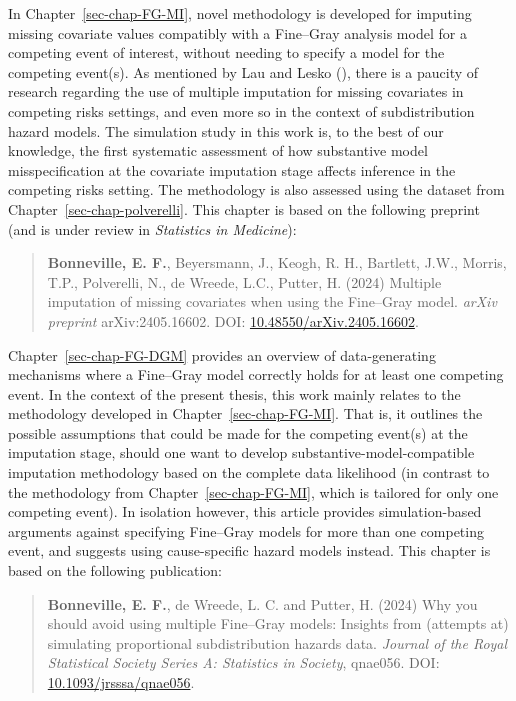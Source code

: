 \documentclass[
  letterpaper,
  paper=240mm:170mm,
  twoside=true,
  open=right,
  fontsize=10pt,
  pagesize=false,
  BCOR=15mm,
  DIV=14,
  headinclude=true,
  footinclude=false,
  headsepline=on]{scrbook}
\begin{document}
In Chapter~\ref{sec-chap-FG-MI}, novel methodology is developed for
imputing missing covariate values compatibly with a Fine--Gray analysis
model for a competing event of interest, without needing to specify a
model for the competing event(s). As mentioned by Lau and Lesko
(), there is a
paucity of research regarding the use of multiple imputation for missing
covariates in competing risks settings, and even more so in the context
of subdistribution hazard models. The simulation study in this work is,
to the best of our knowledge, the first systematic assessment of how
substantive model misspecification at the covariate imputation stage
affects inference in the competing risks setting. The methodology is
also assessed using the dataset from Chapter~\ref{sec-chap-polverelli}.
This chapter is based on the following preprint (and is under review in
\emph{Statistics in Medicine}):

\begin{quote}
\textbf{Bonneville, E. F.}, Beyersmann, J., Keogh, R. H., Bartlett,
J.W., Morris, T.P., Polverelli, N., de Wreede, L.C., Putter, H. (2024)
Multiple imputation of missing covariates when using the Fine--Gray
model. \emph{arXiv preprint} arXiv:2405.16602. DOI:
\href{https://doi.org/10.48550/arXiv.2405.16602}{10.48550/arXiv.2405.16602}.
\end{quote}

Chapter~\ref{sec-chap-FG-DGM} provides an overview of data-generating
mechanisms where a Fine--Gray model correctly holds for at least one
competing event. In the context of the present thesis, this work mainly
relates to the methodology developed in Chapter~\ref{sec-chap-FG-MI}.
That is, it outlines the possible assumptions that could be made for the
competing event(s) at the imputation stage, should one want to develop
substantive-model-compatible imputation methodology based on the
complete data likelihood (in contrast to the methodology from
Chapter~\ref{sec-chap-FG-MI}, which is tailored for only one competing
event). In isolation however, this article provides simulation-based
arguments against specifying Fine--Gray models for more than one
competing event, and suggests using cause-specific hazard models
instead. This chapter is based on the following publication:

\begin{quote}
\textbf{Bonneville, E. F.}, de Wreede, L. C. and Putter, H. (2024) Why
you should avoid using multiple Fine--Gray models: Insights from
(attempts at) simulating proportional subdistribution hazards data.
\emph{Journal of the Royal Statistical Society Series A: Statistics in
Society}, qnae056. DOI:
\href{https://doi.org/10.1093/jrsssa/qnae056}{10.1093/jrsssa/qnae056}.
\end{quote}
\end{document}
